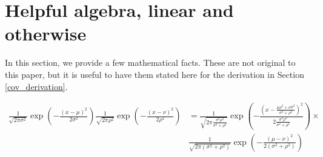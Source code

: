 \documentclass{article}
\begin{document}
\section{Helpful algebra, linear and otherwise}
In this section, we provide a few mathematical facts. These are not original to this paper, but it is useful to have them stated here for the derivation in Section \ref{cov_derivation}.
\begin{fact} \label{univariate}
\begin{align*}
\frac{1}{\sqrt{2\pi\sigma^2}}\exp\left(-\frac{(x-\mu)^2}{2\sigma^2}\right)\frac{1}{\sqrt{2\pi\rho^2}}\exp\left(-\frac{(x-\nu)^2}{2\rho^2}\right)&=\frac{1}{\sqrt{2\pi\frac{\sigma^2\rho^2}{\sigma^2+\rho^2}}}\exp\left(-\frac{\left(x-\frac{\mu\rho^2+\nu\sigma^2}{\sigma^2+\rho^2}\right)^2}{2\frac{\sigma^2\rho^2}{\sigma^2+\rho^2}}\right)\times
\\&\frac{1}{\sqrt{2\pi(\sigma^2+\rho^2)}}\exp\left(-\frac{(\mu-\nu)^2}{2(\sigma^2+\rho^2)}\right)
\end{align*}
\end{fact}
\end{document}
